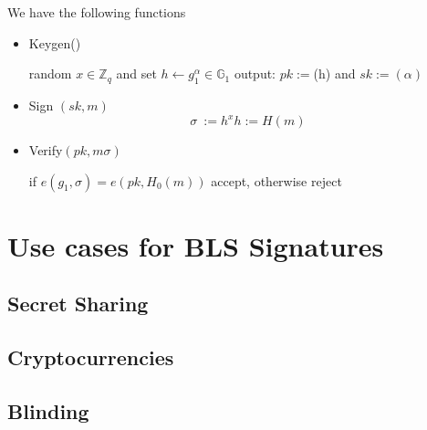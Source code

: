 \documentclass[a4paper,12pt]{scrartcl}
\begin{document}
We have the following functions
\begin{itemize}
	\item Keygen()
	\begin{center}
		random \( x\in \mathbb{Z}_{q} \) and set \( h \leftarrow g_{1}^\alpha\in \mathbb{G}_{1} \) output: \( pk := \)(h) and \( sk := (\alpha) \)
	\end{center}
	\item Sign \( (sk, m) \)
	\[ \sigma\ := h^x  h := H(m) \]
	\item Verify\( (pk, m \sigma) \)
	\begin{center}
		if \( e(g_{1},\sigma) = e(pk, H_{0}(m)) \) accept, otherwise reject
	\end{center}
\end{itemize}

\pagebreak

\section{Use cases for BLS Signatures}
\subsection{Secret Sharing}
\subsection{Cryptocurrencies}
\subsection{Blinding}
\pagebreak

\printbibliography
\end{document}
